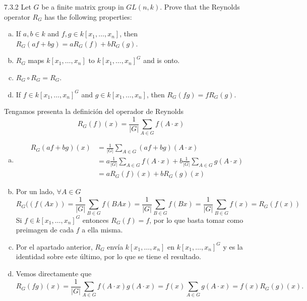 \documentclass[twoside]{article}
\begin{document}
\begin{ejercicio}{7.3.2}
Let $G$ be a finite matrix group in $GL(n, k)$. Prove that the Reynolds operator $R_G$ has the
following properties:
\begin{enumerate}[a.]
\item If $a, b ∈ k$ and $f , g ∈ k[x_1, \dots, x_n]$, then $R_G(af + bg) = aR_G( f) + bR_G(g)$.
\item $R_G$ maps $k[x_1, \dots, x_n]$ to $k[x_1, \dots , x_n]^G$ and is onto.
\item $R_G \circ R_G = R_G$.
\item If $f ∈ k[x_1, \dots, x_n]^G$ and $g ∈ k[x_1, \dots , x_n]$, then $R_G( fg) = f  R_G(g)$.
\end{enumerate}
\end{ejercicio}
\begin{solucion}
Tengamos presenta la definición del operador de Reynolds
\[
R_G( f )(x) =
\frac{1}{|G|}\sum_{A∈G}f (A \cdot x)
\]
\begin{enumerate}[a.]
\item 
\begin{align*}
R_G( af + bg )(x) &= \frac{1}{|G|}\sum_{A∈G}(af + bg) (A \cdot x)\\
&=a\frac{1}{|G|}\sum_{A∈G}f (A \cdot x)+b\frac{1}{|G|}\sum_{A∈G}g (A \cdot x)\\
&=aR_G( f)(x) + bR_G(g)(x)
\end{align*}

\item Por un lado, $\forall A \in G$
$$
R_G((f(Ax)) = \frac{1}{|G|}\sum_{B \in G} f(BAx) = \frac{1}{|G|}\sum_{B \in G} f(Bx) = \frac{1}{|G|}\sum_{B \in G} f(x) = R_G(f(x))
$$
Si $f\in k[x_1,\dotsc,x_n]^G$ entonces $R_G(f)=f$, por lo que basta tomar como preimagen de cada $f$ a ella misma.
\item Por el apartado anterior, $R_G$ envía $k[x_1, \dots, x_n]$ en $k[x_1, \dots, x_n]^G$ y es la identidad sobre este último, por lo que se tiene el resultado.
\item Vemos directamente que 
\[
R_G( fg )(x) =
\frac{1}{|G|}\sum_{A∈G}f (A \cdot x)g(A\cdot x)=f(x)\sum_{A∈G}g(A\cdot x)=f(x)R_G(g)(x).
\]

\end{enumerate}
\end{solucion}

\newpage
\end{document}
